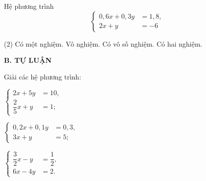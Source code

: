 \begin{exercises}
\begin{questions}[resume=SGK]
        \item Hệ phương trình
        \[
            \left\{
            \begin{aligned}
                0{,}6x+0{,}3y&=1{,}8,\\
                2x+y&=-6
            \end{aligned}
            \right.
        \]
        \begin{tasks}(2)
            \task Có một nghiệm.
            \task Vô nghiệm.
            \task Có vô số nghiệm.
            \task Có hai nghiệm.
        \end{tasks}
        \par\noindent\answerbox\par
    \end{questions}

    \textbf{B. TỰ LUẬN}

    \begin{questions}[resume=SGK]
        \item Giải các hệ phương trình:
        \begin{questions}
            \item $\left\{
                \begin{aligned}
                    2x+5y&=10,\\
                    \dfrac{2}{5}x+y&=1;
                \end{aligned}
                \right.$

            \answerline
            \answerline

            \item $\left\{
                \begin{aligned}
                    0{,}2x+0{,}1y&=0{,}3,\\
                    3x+y&=5;
                \end{aligned}
                \right.$

            \answerline
            \answerline

            \item $\left\{
                \begin{aligned}
                    \dfrac{3}{2}x-y&=\dfrac{1}{2},\\
                    6x-4y&=2.
                \end{aligned}
                \right.$

            \answerline
            \answerline
        \end{questions}


\end{questions}
\end{exercises}

